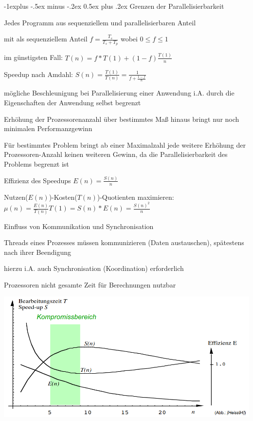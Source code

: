 \documentclass[a4paper]{article}
\makeatletter
\renewcommand{\subsection}{\@startsection{subsection}{2}{0mm}%
 {-1explus -.5ex minus -.2ex}%
 {0.5ex plus .2ex}%
 {\normalfont\normalsize\bfseries}}
\makeatother
\begin{document}
\begin{multicols}{3}
    \subsection{Grenzen der Parallelisierbarkeit}
    \begin{itemize*}
        \item Jedes Programm aus sequenziellem und parallelisierbaren Anteil
        \item mit als sequenziellem Anteil $f=\frac{T_s}{T_s+T_p}$ wobei $0\leq f \leq 1$
        \item im günstigsten Fall: $T(n)=f*T(1)+ (1-f)\frac{T(1)}{n}$
        \item Speedup nach Amdahl: $S(n)=\frac{T(1)}{T(n)}=\frac{1}{f+\frac{1-f}{n}}$
        \item mögliche Beschleunigung bei Parallelisierung einer Anwendung i.A. durch die Eigenschaften der Anwendung selbst begrenzt
        \item Erhöhung der Prozessorenanzahl über bestimmtes Maß hinaus bringt nur noch minimalen Performanzgewinn
        \item Für bestimmtes Problem bringt ab einer Maximalzahl jede weitere Erhöhung der Prozessoren-Anzahl keinen weiteren Gewinn, da die Parallelisierbarkeit des Problems begrenzt ist
        \item Effizienz des Speedups $E(n)=\frac{S(n)}{n}$
        \item Nutzen($E(n)$)-Kosten($T(n)$)-Quotienten maximieren: $\mu(n)=\frac{E(n)}{T(n)} T(1)=S(n)*E(n)=\frac{S(n)^2}{n}$
    \end{itemize*}

    Einfluss von Kommunikation und Synchronisation
    \begin{itemize*}
        \item Threads eines Prozesses müssen kommunizieren (Daten austauschen), spätestens nach ihrer Beendigung
        \item hierzu i.A. auch Synchronisation (Koordination) erforderlich
        \item Prozessoren nicht gesamte Zeit für Berechnungen nutzbar
    \end{itemize*}

    \begin{center}
        \includegraphics[width=.5\linewidth]{Assets/AdvancedOperatingSystems-optimale-prozessoranzahl.png}
    \end{center}


\end{multicols}
\end{document}
